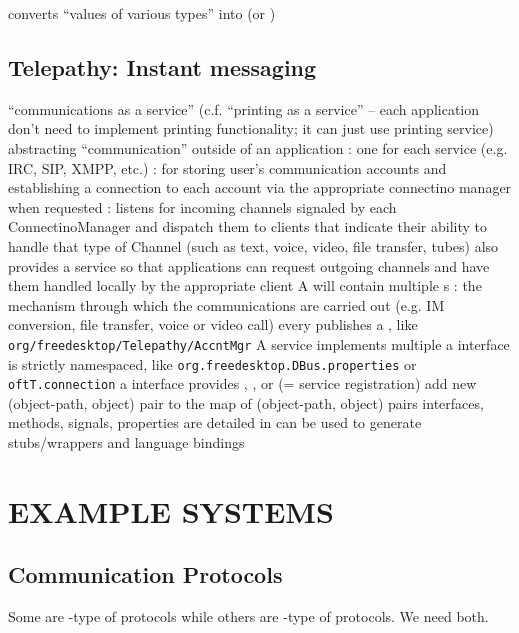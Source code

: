 \documentclass{myproc}
\begin{document}
\w {}
\bit
\w {} converts ``values of various types'' into  (or ) 
\eit
\eit

\subsection{Telepathy: Instant messaging}
\bit
\w ``communications as a service'' (c.f. ``printing as a service'' -- each
application don't need to implement printing functionality; it can just use
printing service)
\w abstracting ``communication'' outside of an application
\w {}: one for each service (e.g. IRC, SIP, XMPP, etc.)
\w {}: for storing user's communication accounts and
establishing a connection to  each account via the appropriate connectino
manager when requested
\w {}:  listens for incoming channels signaled by each
ConnectinoManager and dispatch them to clients that indicate their ability to
handle that type of Channel (such as text, voice, video, file transfer,
tubes) 
  \bit
  \w also provides a service so that applications can request outgoing
  channels and have them handled locally by the appropriate client
  \eit
\w {}
\w {}
  \bit
  \w A  will contain multiple s
  \w {}: the mechanism through which the communications are carried
  out (e.g. IM conversion, file transfer, voice or video call)
  \eit
{}
  \bit
  \w every  publishes a , like
  \verb+org/freedesktop/Telepathy/AccntMgr+
  \w A service implements multiple 
    \bit
    \w a interface is strictly namespaced, like
    \verb+org.freedesktop.DBus.properties+ or \verb+oftT.connection+
    \w a interface provides , , or
    \eit
  \w {} (= service registration)
    \bit
    \w add new (object-path, object) pair to the map of (object-path, object)
    pairs 
    \eit
  \w interfaces, methods, signals, properties are detailed in 
     \bit
     \w can be used to generate stubs/wrappers and language bindings
     \eit
  \eit
\eit


\section{EXAMPLE SYSTEMS}
\subsection{Communication Protocols}
Some are -type of protocols while others are
-type of protocols. We need both.
\end{document}
